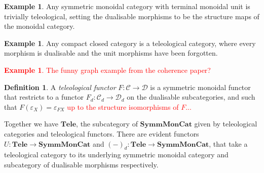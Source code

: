 \documentclass[11pt,a4paper]{article}
\theoremstyle{plain}
\theoremstyle{definition}
\newtheorem{definition}[theorem]{Definition}
\newtheorem{example}[theorem]{Example}
\newcommand{\C}{\mathscr{C}}
\newcommand{\D}{\mathscr{D}}
\newcommand{\SymmMonCat}{\mathbf{SymmMonCat}}
\newcommand{\Tele}{\mathbf{Tele}}
\newcommand{\todo}[1]{\textcolor{red}{\small #1}}
\begin{document}
\begin{example}
Any symmetric monoidal category with terminal monoidal unit is trivially teleological, setting the dualisable morphisms to be the structure maps of the monoidal category.
\end{example}

\begin{example}
Any compact closed category is a teleological category, where every morphism is dualisable and the unit morphisms have been forgotten.
\end{example}

\todo{\begin{example}
The funny graph example from the coherence paper?
\end{example}}

\begin{definition}
A \emph{teleological functor} $F : \C \to \D$ is a symmetric monoidal functor that restricts to a functor $F_d : \C_d \to \D_d$ on the dualisable subcategories, and such that $F(\varepsilon_X) = \varepsilon_{FX}$ \todo{up to the structure isomorphisms of $F$...}
\end{definition}

Together we have $\Tele$, the subcategory of $\SymmMonCat$ given by teleological categories and teleological functors. There are evident functors $U : \Tele \to \SymmMonCat$ and $(-)_d : \Tele \to \SymmMonCat$, that take a teleological category to its underlying symmetric monoidal category and subcategory of dualisable morphisms respectively.
\end{document}
